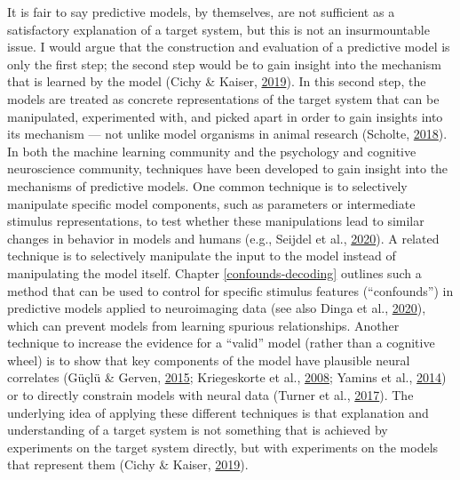 \documentclass[11pt,american,a4paper,oneside,]{memoir} %
\begin{document}
It is fair to say predictive models, by themselves, are not sufficient as a satisfactory explanation of a target system, but this is not an insurmountable issue. I would argue that the construction and evaluation of a predictive model is only the first step; the second step would be to gain insight into the mechanism that is learned by the model (Cichy \& Kaiser, \protect\hyperlink{ref-Cichy2019-zf}{2019}). In this second step, the models are treated as concrete representations of the target system that can be manipulated, experimented with, and picked apart in order to gain insights into its mechanism --- not unlike model organisms in animal research (Scholte, \protect\hyperlink{ref-Scholte2018-he}{2018}). In both the machine learning community and the psychology and cognitive neuroscience community, techniques have been developed to gain insight into the mechanisms of predictive models. One common technique is to selectively manipulate specific model components, such as parameters or intermediate stimulus representations, to test whether these manipulations lead to similar changes in behavior in models and humans (e.g., Seijdel et al., \protect\hyperlink{ref-Seijdel2020-ff}{2020}). A related technique is to selectively manipulate the input to the model instead of manipulating the model itself. Chapter \ref{confounds-decoding} outlines such a method that can be used to control for specific stimulus features (``confounds'') in predictive models applied to neuroimaging data (see also Dinga et al., \protect\hyperlink{ref-Dinga2020-si}{2020}), which can prevent models from learning spurious relationships. Another technique to increase the evidence for a ``valid'' model (rather than a cognitive wheel) is to show that key components of the model have plausible neural correlates (Güçlü \& Gerven, \protect\hyperlink{ref-Guclu2015-qj}{2015}; Kriegeskorte et al., \protect\hyperlink{ref-kriegeskorte2008representational}{2008}; Yamins et al., \protect\hyperlink{ref-yamins2014performance}{2014}) or to directly constrain models with neural data (Turner et al., \protect\hyperlink{ref-Turner2017-fi}{2017}). The underlying idea of applying these different techniques is that explanation and understanding of a target system is not something that is achieved by experiments on the target system directly, but with experiments on the models that represent them (Cichy \& Kaiser, \protect\hyperlink{ref-Cichy2019-zf}{2019}).
\end{document}
